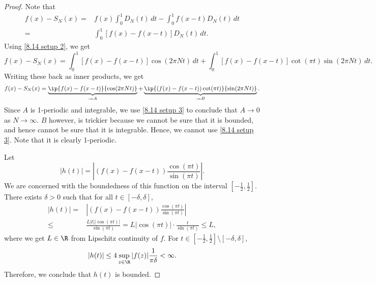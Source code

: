 \begin{proof}
    Note that
    \begin{align*} 
        f(x)-S_N(x)=&f(x)\int_0^1 D_N(t) \, dt - \int_0^1 f(x-t)D_N(t) \, dt\\
                   =&\int_0^1 [f(x)-f(x-t)]D_N(t) \, dt.
    \end{align*}
    Using \cref{8.14 setup 2}, we get 
    \begin{equation*} 
        f(x)-S_N(x)=\int_0^1 [f(x)-f(x-t)]\cos(2\pi Nt) \, dt+\int_0^1 [f(x)-f(x-t)]\cot(\pi t)\sin(2\pi Nt)\, dt.
    \end{equation*}
    Writing these back as inner products, we get
    \begin{equation*} 
        f(x)-S_N(x)=\underbrace{\ip{f(x)-f(x-t)}{\cos(2\pi Nt)}}_{:=A}+\underbrace{\ip{\left(f(x)-f(x-t)\right)\cot(\pi t)}{\sin(2\pi Nt)}}_{:=B}.
    \end{equation*}
    Since \(A\) is 1-periodic and integrable, we use \cref{8.14 setup 3} to conclude that \(A\to 0\) as \(N\to\infty\). \(B\) however, is trickier because we cannot be sure that it is bounded, and hence cannot be sure that it is integrable. Hence, we cannot use \cref{8.14 setup 3}. Note that it is clearly 1-periodic. 

    \medskip

    Let 
    \begin{equation*} 
        |h(t)|=\left|(f(x)-f(x-t))\frac{\cos(\pi t)}{\sin(\pi t)}\right|.
    \end{equation*}
    We are concerned with the boundedness of this function on the interval \(\displaystyle\left[-\frac{1}{2},\frac{1}{2}\right]\). There exists \(\delta>0\) such that for all \(t\in[-\delta,\delta]\), 
    \begin{align*} 
        |h(t)|=&\left|(f(x)-f(x-t))\frac{\cos(\pi t)}{\sin(\pi t)}\right|\\
           \leq&\frac{L|t||\cos(\pi t)|}{\sin(\pi t)}=L|\cos(\pi t)|\cdot\frac{t}{\sin(\pi t)}\leq L,
    \end{align*}
    where we get \(L\in\R\) from Lipschitz continuity of \(f\). For \(t\in\displaystyle\left[-\frac{1}{2},\frac{1}{2}\right]\setminus[-\delta,\delta]\),
    \begin{equation*} 
        |h(t)|\leq 4\sup_{z\in\R}|f(z)|\frac{1}{\pi\delta}<\infty.
    \end{equation*}
    Therefore, we conclude that \(h(t)\) is bounded.

    \smallskip


\end{proof}
